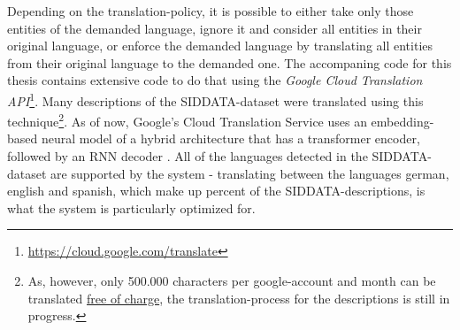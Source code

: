 Depending on the translation-policy, it is possible to either take only those entities of the demanded language, ignore it and consider all entities in their original language, or enforce the demanded language by translating all entities from their original language to the demanded one. The accompaning code for this thesis contains extensive code to do that using the \emph{Google Cloud Translation API}\footnote{\url{https://cloud.google.com/translate}}. Many descriptions of the SIDDATA-dataset were translated using this technique\footnote{As, however, only 500.000 characters per google-account and month can be translated \href{https://cloud.google.com/translate/pricing}{free of charge}, the translation-process for the descriptions is still in progress.}. As of now, Google's Cloud Translation Service uses an embedding-based neural model of a hybrid architecture that has a transformer encoder, followed by an RNN decoder \cite{Chen2018}. All of the languages detected in the SIDDATA-dataset are supported by the system - translating between the languages german, english and spanish, which make up  percent of the SIDDATA-descriptions, is what the system is particularly optimized for. 




